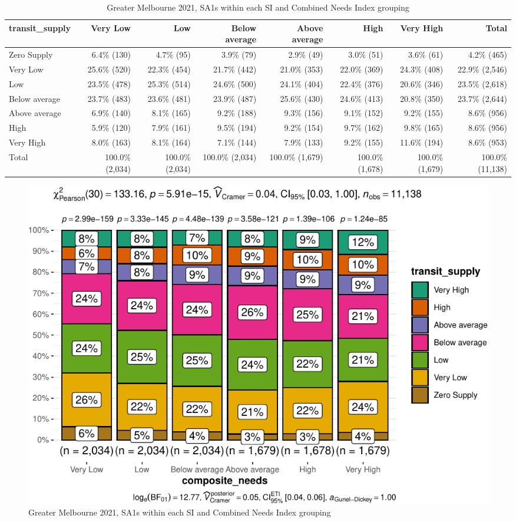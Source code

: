 \documentclass[preprint, 3p,
authoryear]{elsarticle} %
\begin{document}
\begin{table}

\caption{\label{tab:Greater_Melbourne_2021_needs_gap_zones}Greater Melbourne 2021, SA1s within each SI and Combined Needs Index grouping}
\centering
\fontsize{8}{10}\selectfont
\begin{tabular}[t]{l|r|r|r|r|r|r|r}
\hline
transit\_supply & Very Low & Low & Below average & Above average & High & Very High & Total\\
\hline
Zero Supply & 6.4\%   (130) & 4.7\%    (95) & 3.9\%    (79) & 2.9\%    (49) & 3.0\%    (51) & 3.6\%    (61) & 4.2\%    (465)\\
\hline
Very Low & 25.6\%   (520) & 22.3\%   (454) & 21.7\%   (442) & 21.0\%   (353) & 22.0\%   (369) & 24.3\%   (408) & 22.9\%  (2,546)\\
\hline
Low & 23.5\%   (478) & 25.3\%   (514) & 24.6\%   (500) & 24.1\%   (404) & 22.4\%   (376) & 20.6\%   (346) & 23.5\%  (2,618)\\
\hline
Below average & 23.7\%   (483) & 23.6\%   (481) & 23.9\%   (487) & 25.6\%   (430) & 24.6\%   (413) & 20.8\%   (350) & 23.7\%  (2,644)\\
\hline
Above average & 6.9\%   (140) & 8.1\%   (165) & 9.2\%   (188) & 9.3\%   (156) & 9.1\%   (152) & 9.2\%   (155) & 8.6\%    (956)\\
\hline
High & 5.9\%   (120) & 7.9\%   (161) & 9.5\%   (194) & 9.2\%   (154) & 9.7\%   (162) & 9.8\%   (165) & 8.6\%    (956)\\
\hline
Very High & 8.0\%   (163) & 8.1\%   (164) & 7.1\%   (144) & 7.9\%   (133) & 9.2\%   (155) & 11.6\%   (194) & 8.6\%    (953)\\
\hline
Total & 100.0\% (2,034) & 100.0\% (2,034) & 100.0\% (2,034) & 100.0\% (1,679) & 100.0\% (1,678) & 100.0\% (1,679) & 100.0\% (11,138)\\
\hline
\end{tabular}
\end{table}

\begin{figure}
\centering
\includegraphics{Leveraging_GTFS_to_assess_transit_supply_Transport_Geography_files/figure-latex/Greater_Melbourne_2021_needs_gap_zones-1.pdf}
\caption{Greater Melbourne 2021, SA1s within each SI and Combined Needs
Index grouping}
\end{figure}
\end{document}
